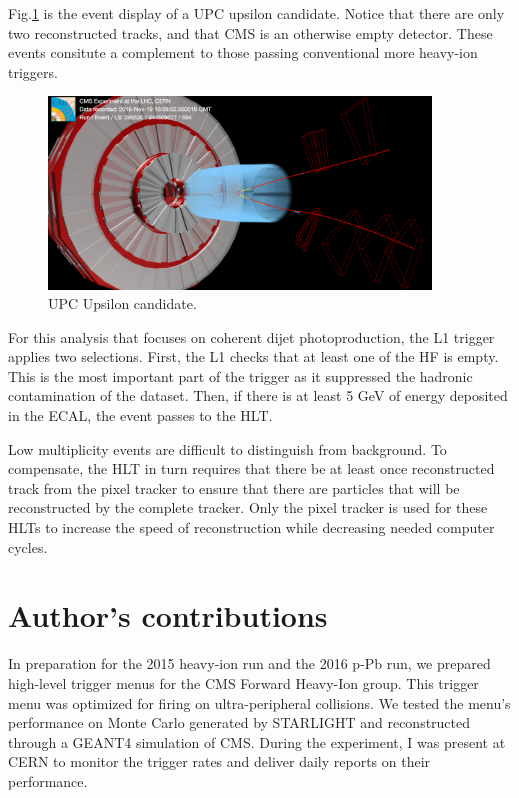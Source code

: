 Fig.\ref{fig:eventdisplayUPCUps} is the event display of a UPC upsilon candidate. Notice that there are only two reconstructed tracks, and that CMS is an otherwise empty detector. These events consitute a complement to those passing conventional more heavy-ion triggers.

\begin{figure}[h!]
\begin{centering}
\includegraphics[width=4in]{Chapter3/importfigs/upcJpsi_run285530_lumi594_event944509077_v0.png}
\par\end{centering}
\caption{UPC Upsilon candidate. \label{fig:eventdisplayUPCUps}}
\end{figure}

For this analysis that focuses on coherent dijet photoproduction, the L1 trigger applies two selections. First, the L1 checks that at least one of the HF is empty. This is the most important part of the trigger as it suppressed the hadronic contamination of the dataset. Then, if there is at least 5 GeV of energy deposited in the ECAL, the event passes to the HLT. 

Low multiplicity events are difficult to distinguish from background. To compensate, the HLT in turn requires that there be at least once reconstructed track from the pixel tracker to ensure that there are particles that will be reconstructed by the complete tracker. Only the pixel tracker is used for these HLTs to increase the speed of reconstruction while decreasing needed computer cycles. 

\section{Author's contributions}

In preparation for the 2015 heavy-ion run and the 2016 p-Pb run, we prepared high-level trigger menus for the CMS Forward Heavy-Ion group. This trigger menu was optimized for firing on ultra-peripheral collisions. We tested the menu's performance on Monte Carlo generated by STARLIGHT \cite{starlight} and reconstructed through a GEANT4 \cite{Agostinelli:2002hh} simulation of CMS. During the experiment, I was present at CERN to monitor the trigger rates and deliver daily reports on their performance. 

